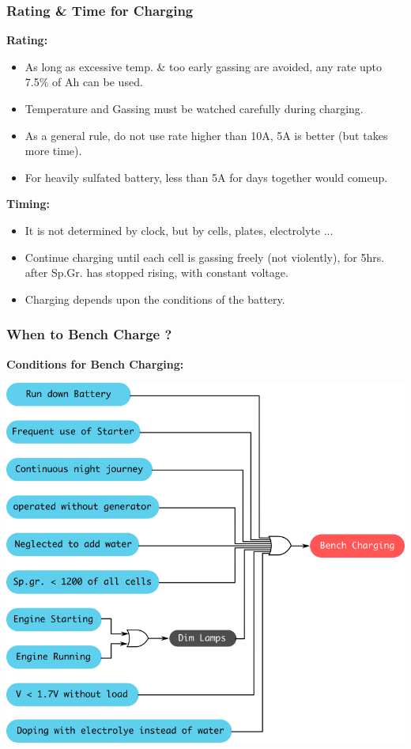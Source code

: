 \documentclass{beamer}
\begin{document}
\begin{frame}
  \frametitle{Rating \& Time for Charging}
  \fontsize{8pt}{11}\selectfont
  \textbf{Rating:}
  \begin{itemize}
    \item As long as excessive temp. \& too early gassing are avoided, any rate upto 7.5\% of Ah can be used.
    \item Temperature and Gassing must be watched carefully during charging.
    \item As a general rule, do not use rate higher than 10A, 5A is better (but takes more time).
    \item For heavily sulfated battery, less than 5A for days together would comeup.
  \end{itemize}
  
  \bigskip
  \textbf{Timing:}
  \begin{itemize}
    \item It is not determined by clock, but by cells, plates, electrolyte ...
    \item Continue charging until each cell is gassing freely (not violently), for 5hrs. after Sp.Gr. has stopped rising, with constant voltage.
    \item Charging depends upon the conditions of the battery.
  \end{itemize}
\end{frame}

\begin{frame}     %
  \frametitle{When to Bench Charge ?}
  \fontsize{8pt}{10}\selectfont
  \textbf{Conditions for Bench Charging:}
  \begin{center}
    \includegraphics[width=0.7\linewidth]{./Resources/Images/conditions_benchcharge.png}
  \end{center}
\end{frame}
\end{document}
